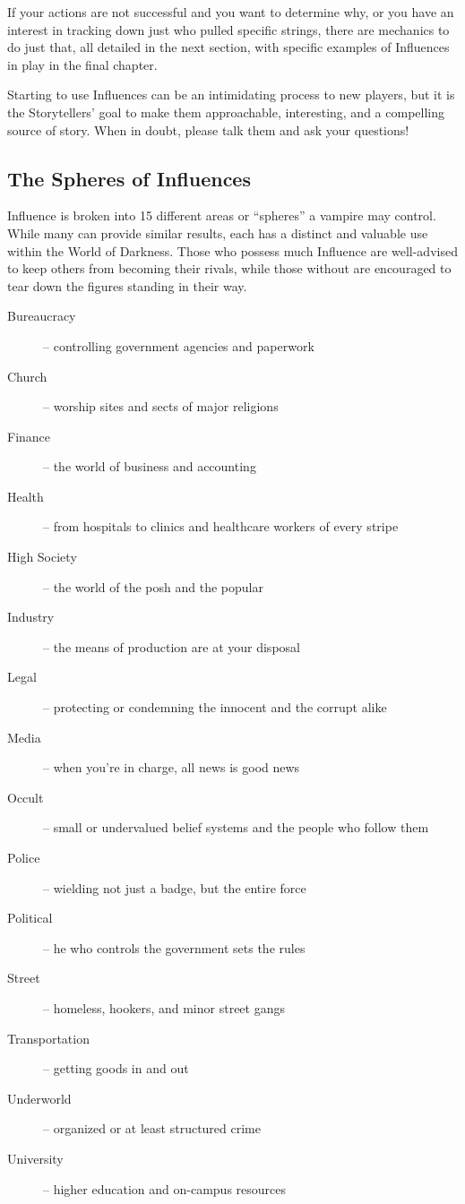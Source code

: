 If your actions are not successful and you want to determine why, or you have an interest in 
tracking down just who pulled specific strings, there are mechanics to do just that, all detailed 
in the next section, with specific examples of Influences in play in the final chapter.

Starting to use Influences can be an intimidating process to new players, but it is the Storytellers' 
goal to make them approachable, interesting, and a compelling source of story.  When in doubt, please talk 
them and ask your questions!

\subsection[Influence Spheres]{The Spheres of Influences}
Influence is broken into 15 different areas or ``spheres'' a vampire may control.  While many 
can provide similar results, each has a distinct and valuable use within the World of Darkness.  
Those who possess much Influence are well-advised to keep others from becoming their rivals, while 
those without are encouraged to tear down the figures standing in their way. \medskip

\begin{description}
	\item[Bureaucracy] -- controlling government agencies and paperwork
	\item[Church] -- worship sites and sects of major religions
	\item[Finance] -- the world of business and accounting
	\item[Health] -- from hospitals to clinics and healthcare workers of every stripe
	\item[High Society] -- the world of the posh and the popular
	\item[Industry] -- the means of production are at your disposal
	\item[Legal] -- protecting or condemning the innocent and the corrupt alike
	\item[Media] -- when you're in charge, all news is good news
	\item[Occult] -- small or undervalued belief systems and the people who follow them
	\item[Police] -- wielding not just a badge, but the entire force
	\item[Political] -- he who controls the government sets the rules
	\item[Street] -- homeless, hookers, and minor street gangs
	\item[Transportation] -- getting goods in and out
	\item[Underworld] -- organized or at least structured crime
	\item[University] -- higher education and on-campus resources
\end{description}
	
